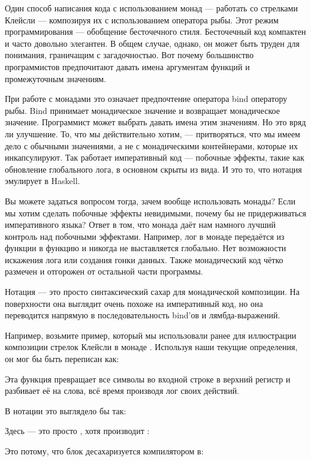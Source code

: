 Один способ написания кода с использованием монад --- работать со стрелками Клейсли ---
композируя их с использованием оператора рыбы. Этот режим программирования ---
обобщение бесточечного стиля. Бесточечный код компактен и
часто довольно элегантен. В общем случае, однако, он может быть труден для понимания,
граничащим с загадочностью. Вот почему большинство программистов предпочитают давать имена
аргументам функций и промежуточным значениям.

При работе с монадами это означает предпочтение оператора bind оператору
рыбы. Bind принимает монадическое значение и возвращает монадическое значение.
Программист может выбрать давать имена этим значениям. Но это
вряд ли улучшение. То, что мы действительно хотим, --- притворяться, что мы
имеем дело с обычными значениями, а не с монадическими контейнерами, которые их инкапсулируют.
Так работает императивный код --- побочные эффекты, такие как
обновление глобального лога, в основном скрыты из вида. И это то, что
нотация  эмулирует в Haskell.

Вы можете задаться вопросом тогда, зачем вообще использовать монады? Если мы хотим сделать
побочные эффекты невидимыми, почему бы не придерживаться императивного языка?
Ответ в том, что монада даёт нам намного лучший контроль над побочными эффектами.
Например, лог в монаде  передаётся из
функции в функцию и никогда не выставляется глобально. Нет
возможности искажения лога или создания гонки данных. Также монадический
код чётко размечен и отгорожен от остальной части
программы.

Нотация  --- это просто синтаксический сахар для монадической
композиции. На поверхности она выглядит очень похоже на императивный код, но она
переводится напрямую в последовательность bind'ов и лямбда-выражений.

Например, возьмите пример, который мы использовали ранее для иллюстрации
композиции стрелок Клейсли в монаде . Используя наши
текущие определения, он мог бы быть переписан как:

Эта функция превращает все символы во входной строке в верхний регистр и
разбивает её на слова, всё время производя лог своих действий.

В нотации  это выглядело бы так:

Здесь  --- это просто , хотя
 производит :

Это потому, что блок  десахаризуется компилятором в:

